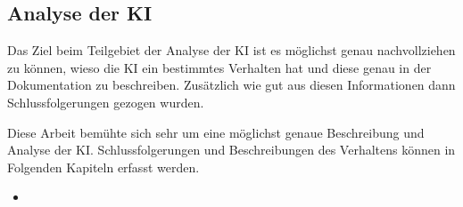 \subsection*{Analyse der KI}
Das Ziel beim Teilgebiet der Analyse der KI ist es möglichst genau
nachvollziehen zu können, wieso die KI ein bestimmtes Verhalten hat und diese
genau in der Dokumentation zu beschreiben. Zusätzlich wie gut aus diesen
Informationen dann Schlussfolgerungen gezogen wurden.

Diese Arbeit bemühte sich sehr um eine möglichst genaue Beschreibung und Analyse
der KI. Schlussfolgerungen und Beschreibungen des Verhaltens können in Folgenden Kapiteln erfasst werden.

\begin{itemize}
    \item 
\end{itemize}
